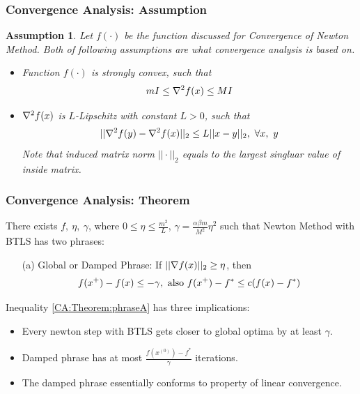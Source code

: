 \documentclass{beamer}
\newcommand{\be}{\begin{eqnarray}}
\newcommand{\ee}{\end{eqnarray}}
\newtheorem{assumption}{Assumption}
\begin{document}
\begin{frame}
    \frametitle{Convergence Analysis: Assumption}    
    \begin{assumption}
        Let $f(\cdot)$ be the function discussed for Convergence of Newton
        Method. Both of following assumptions are what convergence analysis is
        based on.
        \begin{itemize}
            \item Function $f(\cdot)$ is strongly convex, such that
        \be
        m I \leq \fhess \leq M I
        \ee
    \item $\nabla^2 f(x)$ is $L$-Lipschitz with constant $L > 0$, such that
        \be
        || \hessian{}{f}{y} - \hessian{}{f}{x} ||_2 \leq L ||x-y||_2,\ 
        \forall x,\ y
        \ee
        Note that induced matrix norm $|| \cdot ||_2$ equals to the largest
        singluar value of inside matrix.
        \end{itemize}
    \end{assumption}
\end{frame}

\begin{frame}
    \frametitle{Convergence Analysis: Theorem}    
    \begin{theorem}[Part I]
        There exists $f,\ \eta,\ \gamma$, where $ 0 \leq \eta \leq \frac{m^2}{L}$,
        $\gamma = \frac{\alpha \beta m}{M^2}\eta^2$
        such that Newton Method with BTLS has two phrases: 
        \begin{itemize}
            \item[(a)] Global or Damped Phrase: If $||\nabla f(x)||_2 \geq \eta$, then 
                \be
                f(\xp) - f(x) \leq -\gamma, \text{ also } 
                f(\xp) - f^* \leq c(f(x)-f^*) \label{CA:Theorem:phraseA}
                \ee
        \end{itemize}
    \end{theorem}
        Inequality \eqref{CA:Theorem:phraseA} has three implications: 
        \begin{itemize}
            \item Every newton step with BTLS gets closer to global optima by
                at least $\gamma$.
            \item Damped phrase has at most $\frac{f(x^{(0)}) -
                    f^{*}}{\gamma}$ iterations.
            \item The damped phrase essentially conforms to property of linear convergence.
        \end{itemize}
\end{frame}
\end{document}
